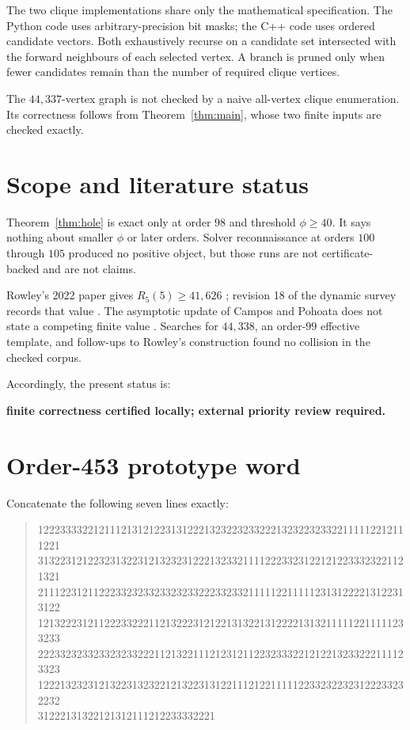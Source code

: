 \documentclass[11pt]{article}
\theoremstyle{definition}
\theoremstyle{remark}
\begin{document}
The two clique implementations share only the mathematical specification.
The Python code uses arbitrary-precision bit masks; the C++ code uses
ordered candidate vectors. Both exhaustively recurse on a candidate set
intersected with the forward neighbours of each selected vertex. A branch is
pruned only when fewer candidates remain than the number of required clique
vertices.

The $44{,}337$-vertex graph is not checked by a naive all-vertex clique
enumeration. Its correctness follows from Theorem~\ref{thm:main}, whose two
finite inputs are checked exactly.

\section{Scope and literature status}

Theorem~\ref{thm:hole} is exact only at order $98$ and threshold
$\phi\ge40$. It says nothing about smaller $\phi$ or later orders. Solver
reconnaissance at orders $100$ through $105$ produced no positive object,
but those runs are not certificate-backed and are not claims.

Rowley's 2022 paper gives $R_5(5)\ge41{,}626$
\cite{rowley-sat}; revision 18 of the dynamic survey records that value
\cite{radziszowski}. The asymptotic update of Campos and Pohoata does not
state a competing finite value \cite{campos-pohoata}. Searches for
$44{,}338$, an order-$99$ effective template, and follow-ups to Rowley's
construction found no collision in the checked corpus.

Accordingly, the present status is:
\begin{center}
\textbf{finite correctness certified locally; external priority review
required.}
\end{center}

\appendix

\section{Order-453 prototype word}
\label{app:prototype}

Concatenate the following seven lines exactly:
\begin{quote}
\ttfamily\scriptsize
1222333322121112131212231312221323223233222132322323322111112212111221\\
3132231212232313223121323231222132332111122233231221212233323221121321\\
2111223121122233232332332323322233233211111221111123131222213122313122\\
1213222312112223322211213222312122131322131222213132111112211111233233\\
2223323233233232332221121322111212312112232333221212213233222111123323\\
1222132323121322313232212132231312211121221111122332322323122233232232\\
31222131322121312111212233332221
\end{quote}
\end{document}

